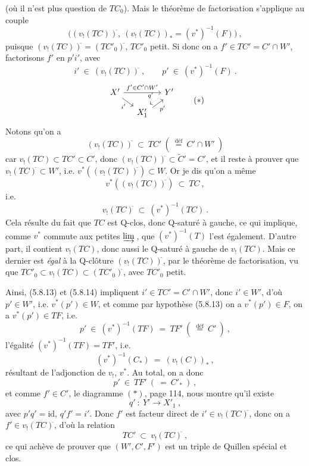 \documentclass[11pt]{article}
\newcommand{\printedpage}[1]{\marginpar{\footnotesize p.~#1}}
\newcommand{\msp}[1]{\marginpar{\footnotesize [#1]}}
\newcommand{\cl}{^{\tilde{}}}%
\newcommand{\defeq}{\overset{\text{déf}}{=}}
\begin{document}
(où il n'est plus question de $TC_0$). Mais le théorème de factorisation s'applique au couple
\[
\Big( (v_!(TC))\cl,\ (v_!(TC))_* = (v^*)^{-1}(F) \Big)\ ,
\]
puisque $(v_!(TC))\cl = (TC'_0)\cl$, $TC'_0$ petit. Si donc on a $f' \in TC' = C' \cap W'$, factorisons $f'$ en $p'i'$, avec
\[
i' \ \in \ (v_!(TC))\cl\ , \qquad p' \ \in \ (v^*)^{-1}(F)\ .
\tag*{(5.8.13)}
\]
\[
\begin{tikzcd}[column sep=small, row sep=small]
X' \arrow[rr, "f' \in C' \cap W'"] \arrow[dr, "i'"'] & & Y' \arrow[dl, dotted, shift right, "q'"'] \\
& X'_1 \arrow[ur, shift right, "p'"'] &
\end{tikzcd}
\tag*{$(*)$}
\]
Notons qu'on a
\msp{page 95}
\[
(v_!(TC))\cl \ \subset \ TC' \ (\ \defeq \ C' \cap W'\ )
\tag*{(5.8.14)}
\]
car $v_!(TC) \subset TC' \subset C'$, donc $(v_!(TC))\cl \subset \tilde{C}' = C'$, et il reste à prouver que $v_!(TC)\cl \subset W'$, i.e. $v^*((v_!(TC))\cl) \subset W$. Or je dis qu'on a même
\[
v^*((v_!(TC))\cl) \ \subset \ TC\ ,
\]
i.e.
\[
v_!(TC)\cl \ \subset \ (v^*)^{-1}(TC)\ .
\tag*{(5.8.15)}
\]
Cela résulte du fait que $TC$ est Q-clos, donc Q-saturé à gauche, ce qui implique, comme $v^*$ commute aux petites $\varinjlim$\,, que $(v^*)^{-1}(T)$ l'est également. D'autre part, il contient $v_!(TC)$, donc aussi le Q-saturé à gauche de $v_!(TC)$. Mais ce dernier est \textit{égal} à la Q-clôture $(v_!(TC))\cl$, par le théorème de factorisation, vu que $TC'_0 \subset v_!(TC) \subset (TC'_0)\cl$, avec $TC'_0$ petit. %

Ainsi, (5.8.13) et (5.8.14) impliquent $i' \in TC' = C' \cap W'$, donc $i' \in W'$, d'où $p' \in W'$, i.e. $v^*(p') \in W$, et comme par hypothèse
\printedpage{48}
\msp{page 96}
(5.8.13) on a $v^*(p') \in F$, on a $v^*(p') \in TF$, i.e.
\[
p' \ \in \ (v^*)^{-1}(TF) \ = \ TF' \ (\ \defeq \ C'\ )\ , %
\]
l'égalité $(v^*)^{-1}(TF) = TF'$, i.e.
\[
(v^*)^{-1}(C_*) \ = \ (v_!(C))_*\ ,
\]
résultant de l'adjonction de $v_!$, $v^*$. Au total, on a donc
\[
p' \ \in \ TF' \ (\ = \ C'_*\ )\ ,
\tag*{(5.8.16)}
\]
et comme $f' \in C'$, le diagramme $(*)$, page 114, nous montre qu'il existe
\[
q' \ : \ Y' \longrightarrow X'_1\ ,
\]
avec $p'q' = \mathrm{id}$, $q'f' = i'$. Donc $f'$ est facteur direct de $i' \in v_!(TC)\cl$, donc on a $f' \in v_!(TC)\cl$, d'où la relation
\[
TC' \ \subset \ v_!(TC)\cl\ ,
\]
ce qui achève de prouver que $(W', C', F')$ est un triple de Quillen spécial et clos.
\end{document}
